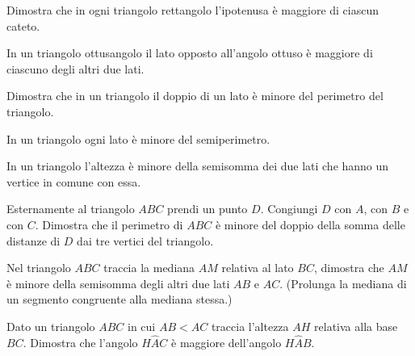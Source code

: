 \begin{multicols}{2}

\begin{esercizio}
\label{ese:3.84}
Dimostra che in ogni triangolo rettangolo l'ipotenusa è maggiore di 
ciascun cateto.
\end{esercizio}

\begin{esercizio}
\label{ese:3.86}
In un triangolo ottusangolo il lato opposto all'angolo ottuso è 
maggiore di ciascuno degli altri due lati.
\end{esercizio}

\begin{esercizio}
\label{ese:3.87}
Dimostra che in un triangolo il doppio di un lato è minore del 
perimetro del triangolo. 
\end{esercizio}

\begin{esercizio}
\label{ese:3.92}
In un triangolo ogni lato è minore del semiperimetro.
\end{esercizio}

\begin{esercizio}
\label{ese:3.93}
In un triangolo l'altezza è minore della semisomma dei due lati che 
hanno un vertice in comune con essa.
\end{esercizio}

\begin{esercizio}
\label{ese:3.98}
Esternamente al triangolo $ABC$ prendi un punto $D$. Congiungi $D$ 
con $A$, con $B$ e con $C$. Dimostra che il perimetro di $ABC$ è 
minore del doppio della somma delle distanze di $D$ dai tre vertici 
del triangolo.
\end{esercizio}

\begin{esercizio}
\label{ese:3.99}
Nel triangolo $ABC$ traccia la mediana $AM$ relativa al lato $BC$, 
dimostra che $AM$ è minore della semisomma degli altri due lati $AB$ 
e $AC$. (Prolunga la mediana di un segmento congruente alla mediana 
stessa.)
\end{esercizio}

\begin{esercizio}
\label{ese:3.102}
Dato un triangolo $ABC$ in cui $AB<AC$ traccia l'altezza $AH$ 
relativa alla base $BC$. Dimostra che l'angolo $H\widehat{A}C$ è 
maggiore dell'angolo $H\widehat{A}B$.
\end{esercizio}

% 

\end{multicols}

